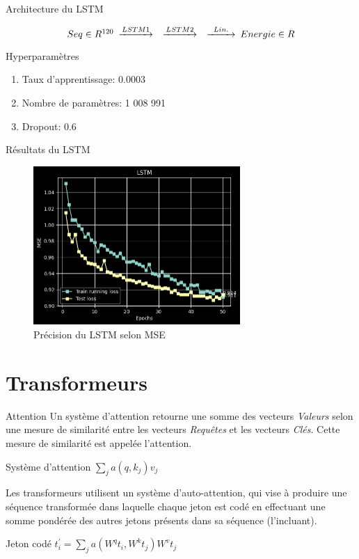 \documentclass{beamer}
\begin{document}
\begin{frame}{Architecture du LSTM}

\begin{equation*}
    \begin{CD}
        @. Seq \in R^{120}
        @>LSTM1>> 
        @>LSTM2>> 
        @>Lin.>> 
        Energie \in R
    \end{CD}
\end{equation*}

\begin{block}{Hyperparamètres}
\begin{enumerate}
    \item Taux d'apprentissage: 0.0003
    \item Nombre de paramètres: 1 008 991 
    \item Dropout: 0.6
\end{enumerate}
\end{block}

\end{frame}

\begin{frame}{Résultats du LSTM}

\begin{figure} \label{fig:lstm}
    \caption{Précision du LSTM selon MSE} \center
    \includegraphics[width=0.7\textwidth]{images/lstm.png}
\end{figure}

\end{frame}
\section{Transformeurs}

\begin{frame}{Attention}
Un système d'attention retourne une somme des vecteurs \emph{Valeurs} selon 
une mesure de similarité entre les vecteurs \emph{Requêtes} et les vecteurs \emph{Clés}.
Cette mesure de similarité est appelée l'attention.
    \begin{block}{Système d'attention}
        $\sum_{j} a(q, k_j) v_j$
    \end{block}
Les transformeurs utilisent un système d'auto-attention, qui vise à produire
une séquence transformée dans laquelle chaque jeton est codé en effectuant une somme pondérée des
autres jetons présents dans sa séquence (l'incluant).
    \begin{block}{Jeton codé}
        $t_{i}^{'} = \sum_{j} a(W^{q}t_{i}, W^{k}t_j) W^{v}t_j$
    \end{block}
\end{frame}
\end{document}
